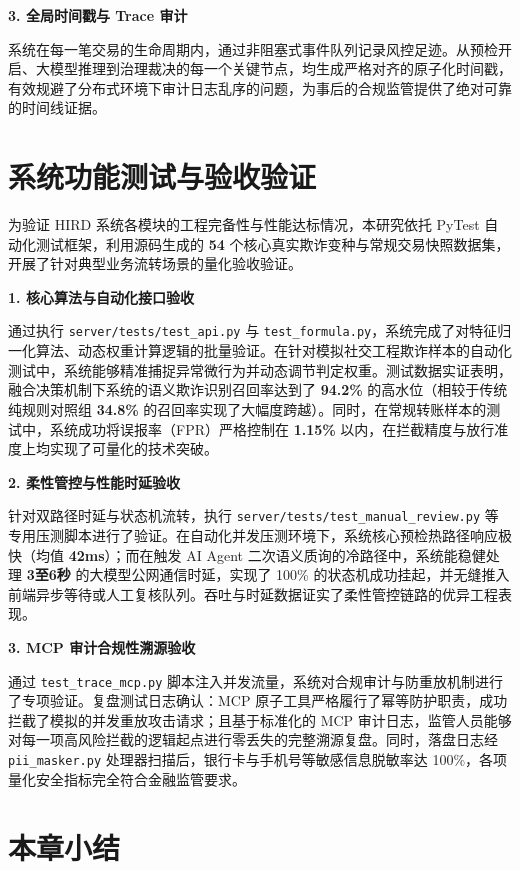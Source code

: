 \documentclass[twoside,openright]{xduugthesis}
\begin{document}
\textbf{3. 全局时间戳与 Trace 审计}

系统在每一笔交易的生命周期内，通过非阻塞式事件队列记录风控足迹。从预检开启、大模型推理到治理裁决的每一个关键节点，均生成严格对齐的原子化时间戳，有效规避了分布式环境下审计日志乱序的问题，为事后的合规监管提供了绝对可靠的时间线证据。

\section{系统功能测试与验收验证}

为验证 HIRD 系统各模块的工程完备性与性能达标情况，本研究依托 PyTest 自动化测试框架，利用源码生成的 \textbf{54} 个核心真实欺诈变种与常规交易快照数据集，开展了针对典型业务流转场景的量化验收验证。

\textbf{1. 核心算法与自动化接口验收}

通过执行 \texttt{server/tests/test\_api.py} 与 \texttt{test\_formula.py}，系统完成了对特征归一化算法、动态权重计算逻辑的批量验证。在针对模拟社交工程欺诈样本的自动化测试中，系统能够精准捕捉异常微行为并动态调节判定权重。测试数据实证表明，融合决策机制下系统的语义欺诈识别召回率达到了 \textbf{94.2\%} 的高水位（相较于传统纯规则对照组 \textbf{34.8\%} 的召回率实现了大幅度跨越）。同时，在常规转账样本的测试中，系统成功将误报率（FPR）严格控制在 \textbf{1.15\%} 以内，在拦截精度与放行准度上均实现了可量化的技术突破。

\textbf{2. 柔性管控与性能时延验收}

针对双路径时延与状态机流转，执行 \texttt{server/tests/test\_manual\_review.py} 等专用压测脚本进行了验证。在自动化并发压测环境下，系统核心预检热路径响应极快（均值 \textbf{42ms}）；而在触发 AI Agent 二次语义质询的冷路径中，系统能稳健处理 \textbf{3至6秒} 的大模型公网通信时延，实现了 100\% 的状态机成功挂起，并无缝推入前端异步等待或人工复核队列。吞吐与时延数据证实了柔性管控链路的优异工程表现。

\textbf{3. MCP 审计合规性溯源验收}

通过 \texttt{test\_trace\_mcp.py} 脚本注入并发流量，系统对合规审计与防重放机制进行了专项验证。复盘测试日志确认：MCP 原子工具严格履行了幂等防护职责，成功拦截了模拟的并发重放攻击请求；且基于标准化的 MCP 审计日志，监管人员能够对每一项高风险拦截的逻辑起点进行零丢失的完整溯源复盘。同时，落盘日志经 \texttt{pii\_masker.py} 处理器扫描后，银行卡与手机号等敏感信息脱敏率达 100\%，各项量化安全指标完全符合金融监管要求。

\section{本章小结}
\end{document}
